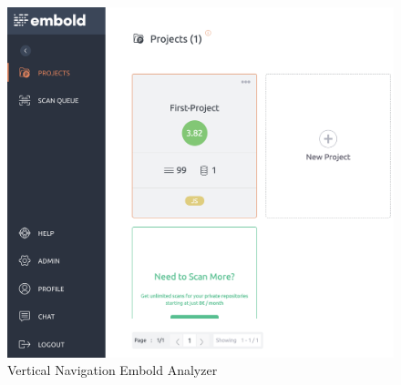\begin{figure}[htbp]
\begin{center}
\includegraphics[width=6.5 in, height=3 in]{vertical.png}
\caption{Vertical Navigation Embold Analyzer}
\label{fig:vertical}
\end{center}
\end{figure}

